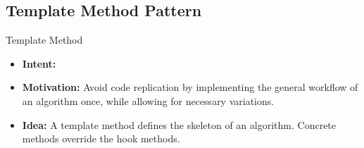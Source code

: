\subsection{Template Method Pattern}
\begin{frame}{\myframetitle}
	\begin{mycolumns}[widths={40}]
		\begin{definition}{Template Method }
			\begin{itemize}
				\item {\bf Intent:} 
				\item {\bf Motivation:}  Avoid code replication by implementing the general workflow of an algorithm once, while allowing for necessary variations.
				\item {\bf Idea:} A template method defines the skeleton of an algorithm. Concrete methods override the hook methods.
			\end{itemize}
		\end{definition}
	\mynextcolumn
	\end{mycolumns}
\end{frame}

\newcommand{\objectadapter}[1]{\pic[#1,page=1,trim=110 240 495 200,clip]{diagramsnet-designpatterns-print}}
\newcommand{\composite}[1]{\pic[#1,page=2,trim=200 300 405 115,clip]{diagramsnet-designpatterns-print}}
\newcommand{\decorator}[1]{\pic[#1,page=4,trim=185 205 355 135,clip]{diagramsnet-designpatterns-print}}
\newcommand{\decoratorexample}[1]{\pic[#1,page=5,trim=185 260 340 135,clip]{diagramsnet-designpatterns-print}}

\newcommand{\singleton}[1]{\pic[#1,page=6,trim=55 425 665 85,clip]{diagramsnet-designpatterns-print}}
\newcommand{\singletonexample}[1]{\pic[#1,page=7,trim=55 425 665 85,clip]{diagramsnet-designpatterns-print}}
\newcommand{\abstractfactory}[1]{\pic[#1,page=8,trim=200 350 280 65,clip]{diagramsnet-designpatterns-print}}

\newcommand{\observer}[1]{\pic[#1,page=9,trim=285 350 320 55,clip]{diagramsnet-designpatterns-print}}

\newcommand{\profcalculator}[1]{\pic[#1,trim=190 185 130 105,clip]{diagramsnet-designpatterns-print}}

